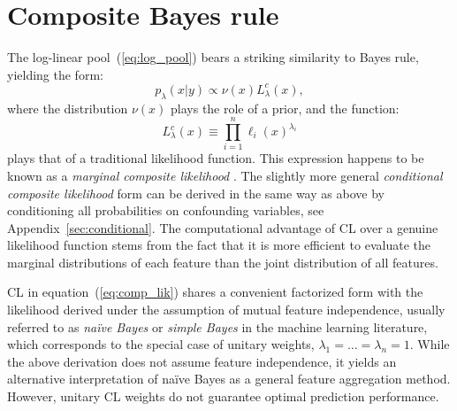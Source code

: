 \documentclass[english]{scrartcl}
\begin{document}





\section{Composite Bayes rule}
\label{sec:bayes_rule}

The log-linear pool~(\ref{eq:log_pool}) bears a striking similarity to Bayes rule, yielding  the form: 
$$
p_\lambda(x|y)\propto \nu(x) L^c_\lambda(x),
$$
where the distribution $\nu(x)$ plays the role of a prior, and the function:
\begin{equation}
\label{eq:comp_lik}
L^c_\lambda(x) \equiv \prod_{i=1}^n \ell_i (x)^{\lambda_i}
\end{equation} 
plays that of a traditional likelihood function. This expression happens to be known as a {\em marginal composite likelihood} \cite{Varin-11}. The slightly more general {\em conditional composite likelihood} form can be derived in the same way as above by conditioning all probabilities on confounding variables, see Appendix~\ref{sec:conditional}. The computational advantage of CL over a genuine likelihood function stems from the fact that it is more efficient to evaluate the marginal distributions of each feature than the joint distribution of all features.

CL in equation~(\ref{eq:comp_lik}) shares a convenient factorized form with the likelihood derived under the assumption of mutual feature independence, usually referred to as {\em na\"ive Bayes} or {\em simple Bayes} in the machine learning literature, which corresponds to the special case of unitary weights, $\lambda_1=\ldots=\lambda_n= 1$. While the above derivation does not assume feature independence, it yields an alternative interpretation of na\"ive Bayes as a general feature aggregation method. However, unitary CL weights do not guarantee optimal prediction performance.
\end{document}
